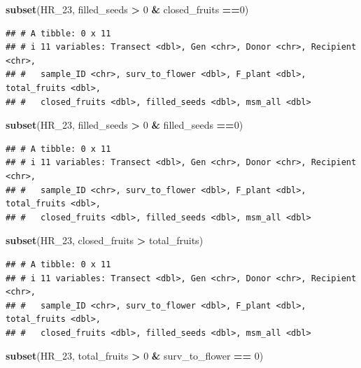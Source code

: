 \documentclass[
]{article}
\newenvironment{Shaded}{\begin{snugshade}}{\end{snugshade}}
\newcommand{\DecValTok}[1]{\textcolor[rgb]{0.00,0.00,0.81}{#1}}
\newcommand{\FunctionTok}[1]{\textcolor[rgb]{0.13,0.29,0.53}{\textbf{#1}}}
\newcommand{\NormalTok}[1]{#1}
\newcommand{\SpecialCharTok}[1]{\textcolor[rgb]{0.81,0.36,0.00}{\textbf{#1}}}
\begin{document}
\begin{Shaded}
\begin{Highlighting}[]
\FunctionTok{subset}\NormalTok{(HR\_23, filled\_seeds }\SpecialCharTok{\textgreater{}} \DecValTok{0} \SpecialCharTok{\&}\NormalTok{ closed\_fruits }\SpecialCharTok{==}\DecValTok{0}\NormalTok{)}
\end{Highlighting}
\end{Shaded}

\begin{verbatim}
## # A tibble: 0 x 11
## # i 11 variables: Transect <dbl>, Gen <chr>, Donor <chr>, Recipient <chr>,
## #   sample_ID <chr>, surv_to_flower <dbl>, F_plant <dbl>, total_fruits <dbl>,
## #   closed_fruits <dbl>, filled_seeds <dbl>, msm_all <dbl>
\end{verbatim}

\begin{Shaded}
\begin{Highlighting}[]
\FunctionTok{subset}\NormalTok{(HR\_23, filled\_seeds }\SpecialCharTok{\textgreater{}} \DecValTok{0} \SpecialCharTok{\&}\NormalTok{ filled\_seeds }\SpecialCharTok{==}\DecValTok{0}\NormalTok{)}
\end{Highlighting}
\end{Shaded}

\begin{verbatim}
## # A tibble: 0 x 11
## # i 11 variables: Transect <dbl>, Gen <chr>, Donor <chr>, Recipient <chr>,
## #   sample_ID <chr>, surv_to_flower <dbl>, F_plant <dbl>, total_fruits <dbl>,
## #   closed_fruits <dbl>, filled_seeds <dbl>, msm_all <dbl>
\end{verbatim}

\begin{Shaded}
\begin{Highlighting}[]
\FunctionTok{subset}\NormalTok{(HR\_23, closed\_fruits }\SpecialCharTok{\textgreater{}}\NormalTok{ total\_fruits)}
\end{Highlighting}
\end{Shaded}

\begin{verbatim}
## # A tibble: 0 x 11
## # i 11 variables: Transect <dbl>, Gen <chr>, Donor <chr>, Recipient <chr>,
## #   sample_ID <chr>, surv_to_flower <dbl>, F_plant <dbl>, total_fruits <dbl>,
## #   closed_fruits <dbl>, filled_seeds <dbl>, msm_all <dbl>
\end{verbatim}

\begin{Shaded}
\begin{Highlighting}[]
\FunctionTok{subset}\NormalTok{(HR\_23, total\_fruits }\SpecialCharTok{\textgreater{}} \DecValTok{0} \SpecialCharTok{\&}\NormalTok{ surv\_to\_flower  }\SpecialCharTok{==} \DecValTok{0}\NormalTok{)}
\end{Highlighting}
\end{Shaded}
\end{document}
